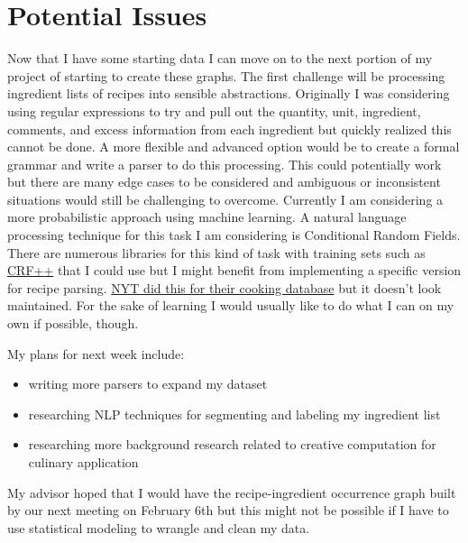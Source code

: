 \documentclass{article}
\begin{document}
\section{Potential Issues}
Now that I have some starting data I can move on to the next portion of my project of starting to create these graphs. The first challenge will be processing ingredient lists of recipes into sensible abstractions. Originally I was considering using regular expressions to try and pull out the quantity, unit, ingredient, comments, and excess information from each ingredient but quickly realized this cannot be done. A more flexible and advanced option would be to create a formal grammar and write a parser to do this processing. This could potentially work but there are many edge cases to be considered and ambiguous or inconsistent situations would still be challenging to overcome. Currently I am considering a more probabilistic approach using machine learning. A natural language processing technique for this task I am considering is Conditional Random Fields. There are numerous libraries for this kind of task with training sets such as \href{https://taku910.github.io/crfpp/}{CRF++} that I could use but I might benefit from implementing a specific version for recipe parsing. \href{https://open.blogs.nytimes.com/2015/04/09/extracting-structured-data-from-recipes-using-conditional-random-fields/}{NYT did this for their cooking database} but it doesn't look maintained. For the sake of learning I would usually like to do what I can on my own if possible, though.

My plans for next week include:
\begin{itemize}
\item writing more parsers to expand my dataset
\item researching NLP techniques for segmenting and labeling my ingredient list
\item researching more background research related to creative computation for culinary application
\end{itemize}

My advisor hoped that I would have the recipe-ingredient occurrence graph built by our next meeting on February 6th but this might not be possible if I have to use statistical modeling to wrangle and clean my data.
\end{document}
